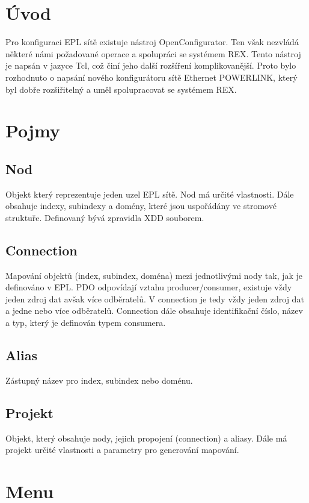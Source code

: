 \newpage
\section{Úvod}
Pro konfiguraci EPL sítě existuje nástroj OpenConfigurator.
Ten však nezvládá některé námi požadované operace a spolupráci se systémem REX.
Tento nástroj je napsán v jazyce Tcl, což činí jeho další rozšíření komplikovanější.
Proto bylo rozhodnuto o napsání nového konfigurátoru sítě Ethernet POWERLINK, 
který byl dobře rozšiřitelný a uměl spolupracovat se systémem REX.

%
%
\section{Pojmy}
\subsection{Nod}
Objekt který reprezentuje jeden uzel EPL sítě. 
Nod má určité vlastnosti. 
Dále obsahuje indexy, subindexy a domény, které jsou uspořádány ve stromové struktuře.
Definovaný bývá zpravidla XDD souborem.

\subsection{Connection}
Mapování objektů (index, subindex, doména) mezi jednotlivými nody tak, jak je definováno v EPL.
PDO odpovídají vztahu producer/consumer, existuje vždy jeden zdroj dat avšak více odběratelů. 
V connection je tedy vždy jeden zdroj dat a jedne nebo více odběratelů. 
Connection dále obsahuje identifikační číslo, název a typ, který je definován typem consumera.

\subsection{Alias}
Zástupný název pro index, subindex nebo doménu.

\subsection{Projekt}
Objekt, který obsahuje nody, jejich propojení (connection) a aliasy.
Dále má projekt určité vlastnosti a parametry pro generování mapování.

%
%
\section{Menu}
